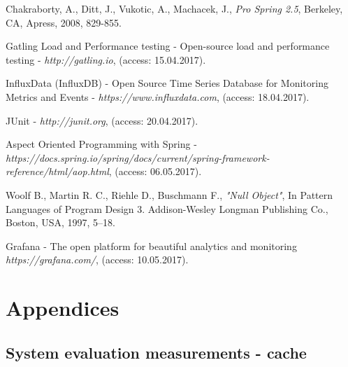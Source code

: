 \documentclass[10pt,a4paper]{article}
\begin{document}
\begin{thebibliography}{9}
Chakraborty, A., Ditt, J., Vukotic, A., Machacek, J., \textit{Pro Spring 2.5}, Berkeley, CA, Apress, 2008, 829-855.  

Gatling Load and Performance testing - Open-source load and performance testing - \textit{http://gatling.io}, (access: 15.04.2017).

InfluxData (InfluxDB) - Open Source Time Series Database for Monitoring Metrics and Events - \textit{https://www.influxdata.com}, (access: 18.04.2017).


JUnit - \textit{http://junit.org}, (access: 20.04.2017).

Aspect Oriented Programming with Spring - \\
\textit{https://docs.spring.io/spring/docs/current/spring-framework-reference/html/aop.html}, (access: 06.05.2017).

Woolf B., Martin R. C., Riehle D., Buschmann F., \textit{"Null Object"}, In Pattern Languages of Program Design 3. Addison-Wesley Longman Publishing Co., Boston, USA, 1997, 5–18. 

Grafana - The open platform for beautiful analytics and monitoring \textit{https://grafana.com/}, (access: 10.05.2017).

\end{thebibliography}

\pagebreak
\clearpage
\section{Appendices} \label{section:appendices}

\appendix
\setcounter{table}{0}
\renewcommand{\thesubsection}{\Alph{subsection}}
\renewcommand{\thetable}{\Alph{subsection}.\numberwithin{table}{subsection}}

\subsection{System evaluation measurements - cache} \label{appendixcacheeval}
\end{document}
